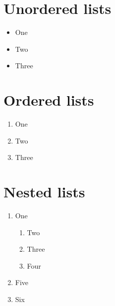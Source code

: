 \documentclass[12pt]{article}
\begin{document}
	\section{Unordered lists}
	
	\begin{itemize}
	
		\item One
		\item Two
		\item Three
	
	\end{itemize}		
	
	
	\section{Ordered lists}
	
	\begin{enumerate}
	
		\item One
		\item Two
		\item Three
		
	\end{enumerate}		
	
	
	\section{Nested lists}
	
	\begin{enumerate}
	
		\item One
		
		\begin{enumerate}
			\item Two
			\item Three
			\item Four
		\end{enumerate}
		
		\item Five
		\item Six
		
	\end{enumerate}	
	
\end{document}
